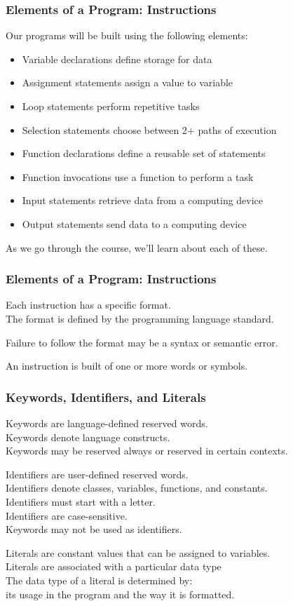 \begin{frame}
\frametitle{Elements of a Program: Instructions}

Our programs will be built using the following elements:
\begin{itemize}
	\item Variable declarations define storage for data
	\item Assignment statements assign a value to variable
	\item Loop statements perform repetitive tasks
	\item Selection statements choose between 2+ paths of execution
	\item Function declarations define a reusable set of statements
	\item Function invocations use a function to perform a task
	\item Input statements retrieve data from a computing device
	\item Output statements send data to a computing device
\end{itemize}

As we go through the course, we'll learn about each of these.

\end{frame}

\begin{frame}
\frametitle{Elements of a Program: Instructions}

Each instruction has a specific format.\\
\quad The format is defined by the programming language standard.

Failure to follow the format may be a syntax or semantic error.

An instruction is built of one or more words or symbols.

\end{frame}

\begin{frame}
\frametitle{Keywords, Identifiers, and Literals}

\alert{Keywords} are language-defined reserved words.\\
	\quad Keywords denote language constructs.\\
	\quad Keywords may be reserved always or reserved in certain contexts.
	

\alert{Identifiers} are user-defined reserved words.\\
	\quad Identifiers denote classes, variables, functions, and constants.\\
	\quad Identifiers must start with a letter.\\
	\quad Identifiers are case-sensitive.\\
	\quad Keywords may not be used as identifiers.
	
	
\alert{Literals} are constant values that can be assigned to variables.\\
	\quad Literals are associated with a particular data type\\
	\quad The data type of a literal is determined by:\\
	\quad\quad its usage in the program and the way it is formatted.


\end{frame}

